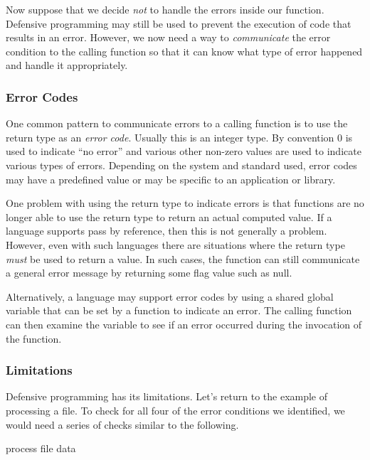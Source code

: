Now suppose that we decide \emph{not} to handle the
errors inside our function.  Defensive programming may
still be used to prevent the execution of code that results
in an error.  However, we now need a way to \emph{communicate}
the error condition to the calling function so that it can 
know what type of error happened and handle it appropriately.

\subsubsection{Error Codes}

One common pattern to communicate errors to a calling
function is to use the return type as an \emph{error code}.
Usually this is an integer type.  By convention 0 is used to
indicate ``no error'' and various other non-zero values are
used to indicate various types of errors.  Depending on 
the system and standard used, error codes may have a 
predefined value or may be specific to an application or library.

One problem with using the return type to indicate errors is 
that functions are no longer able to use the return type to 
return an actual computed value.  If a language supports
pass by reference, then this is not generally a problem.  However,
even with such languages there are situations where the
return type \emph{must} be used to return a value.  In
such cases, the function can still communicate a general
error message by returning some flag value such as null.

Alternatively, a language may support error codes by using
a shared global variable that can be set by a function to
indicate an error.  The calling function can then examine
the variable to see if an error occurred during the invocation
of the function.

\subsubsection{Limitations}

Defensive programming has its limitations.  Let's return
to the example of processing a file.  To check for all four 
of the error conditions we identified, we would need a 
series of checks similar to the following.

\begin{algorithm}[H]
process file data \;
\end{algorithm}

